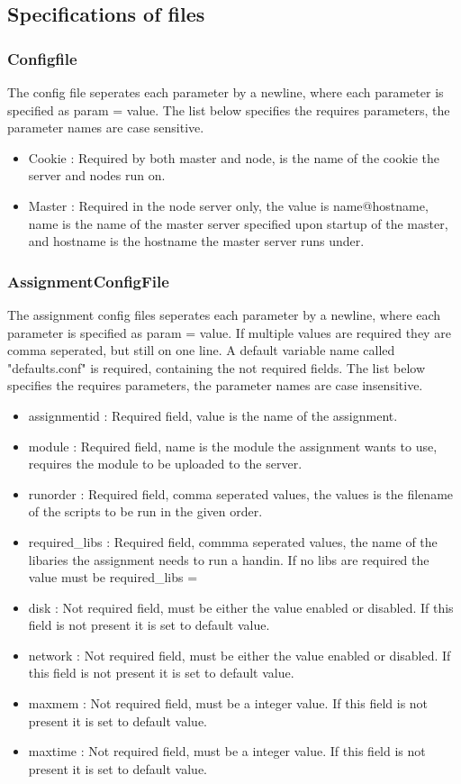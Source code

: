 \subsection{Specifications of files}
\subsubsection{Configfile}
\label{sec:config}
The config file seperates each parameter by a newline, where each parameter is specified as param = value.
The list below specifies the requires parameters, the parameter names are case sensitive.
\begin{itemize}
    \item Cookie : Required by both master and node, is the name of the cookie the server and nodes run on.
    \item Master : Required in the node server only, the value is name@hostname, name is the name of the master server specified upon startup of the master, and hostname is the hostname the master server runs under.
\end{itemize}
\subsubsection{AssignmentConfigFile}
\label{sec:assignment}
The assignment config files seperates each parameter by a newline, where each parameter is specified as param = value. If multiple values are required they are comma seperated, but still on one line. A default variable name called "defaults.conf" is required, containing the not required fields.
The list below specifies the requires parameters, the parameter names are case insensitive.
\begin{itemize}
    \item assignmentid : Required field, value is the name of the assignment.
    \item module : Required field, name is the module the assignment wants to use, requires the module to be uploaded to the server.
    \item runorder : Required field, comma seperated values, the values is the filename of the scripts to be run in the given order.
    \item required\_libs : Required field, commma seperated values, the name of the libaries the assignment needs to run a handin. If no libs are required the value must be required\_libs =
    \item disk : Not required field, must be either the value enabled or disabled. If this field is not present it is set to default value.
    \item network : Not required field, must be either the value enabled or disabled. If this field is not present it is set to default value.
    \item maxmem : Not required field, must be a integer value. If this field is not present it is set to default value.
    \item maxtime : Not required field, must be a integer value. If this field is not present it is set to default value.
\end{itemize}







